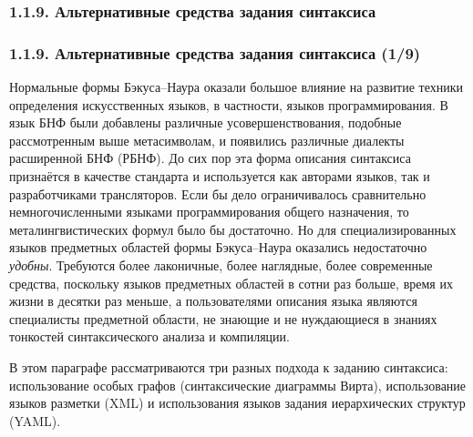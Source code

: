 \subsubsection{1.1.9. Альтернативные средства задания синтаксиса}\label{1.1.9.}
\begin{frame}
\frametitle{1.1.9. Альтернативные средства задания синтаксиса (1/9)}

\begin{digress}
Нормальные формы Бэкуса--Наура 
оказали большое влияние 
на развитие техники определения 
искусственных языков, в частности, языков программирования.
В язык БНФ были добавлены различные усовершенствования,
подобные рассмотренным выше метасимволам,
и появились различные диалекты расширенной БНФ (РБНФ).
До сих пор эта форма 
описания синтаксиса признаётся в качестве 
стандарта
и используется как авторами языков,
так и разработчиками трансляторов.
Если бы дело ограничивалось 
сравнительно немногочисленными языками
программирования общего назначения,
то металингвистических формул было бы достаточно.
Но для специализированных языков 
предметных областей формы Бэкуса--Наура
оказались недостаточно {\em удобны}.
Требуются более лаконичные, более 
наглядные, более современные средства,
поскольку языков предметных областей 
в сотни раз больше, время их жизни в десятки
раз меньше, а пользователями
описания языка являются специалисты предметной
области, не знающие и не нуждающиеся в 
знаниях тонкостей синтаксического анализа 
и компиляции.
\end{digress}

\smallskip
В этом параграфе рассматриваются три разных 
подхода к заданию синтаксиса: 
использование особых графов (синтаксические диаграммы Вирта), 
использование языков разметки (XML) 
и использования языков задания иерархических структур (YAML).  
\end{frame}

